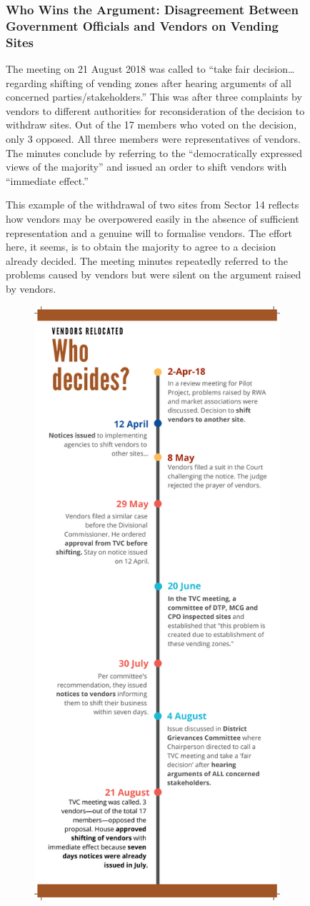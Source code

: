 \documentclass[a4paper, 12pt, twoside]{article}
\begin{document}
\begin{figure}
{\subsubsection*{Who Wins the Argument: Disagreement Between Government Officials and Vendors on Vending Sites}


The meeting on 21 August 2018 was called to “take fair decision… regarding shifting of vending zones after hearing arguments of all concerned parties/stakeholders.” This was after three complaints by vendors to different authorities for reconsideration of the decision to withdraw sites. Out of the 17 members who voted on the decision, only 3 opposed. All three members were representatives of vendors. The minutes conclude by referring to the “democratically expressed views of the majority” and issued an order to shift vendors with “immediate effect.”

This example of the withdrawal of two sites from Sector 14 reflects how vendors may be overpowered easily in the absence of sufficient representation and a genuine will to formalise vendors. The effort here, it seems, is to obtain the majority to agree to a decision already decided. The meeting minutes repeatedly referred to the problems caused by vendors but were silent on the argument raised by vendors.



\begin{figure}
\centering
\includegraphics[height=1.15\textwidth]{WhoDecides.pdf}


\end{figure}}
\end{figure}
\end{document}
